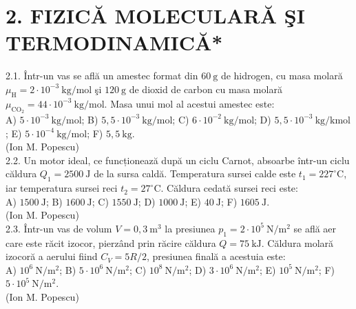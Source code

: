 
\section*{2. FIZICĂ MOLECULARĂ ŞI TERMODINAMICĂ*}


2.1. Într-un vas se află un amestec format din $60 \mathrm{~g}$ de hidrogen, cu masa molară $\mu_{\mathrm{H}}=2 \cdot 10^{-3} \mathrm{~kg} / \mathrm{mol}$ şi $120 \mathrm{~g}$ de dioxid de carbon cu masa molară $\mu_{\mathrm{CO_{2}}}=44 \cdot 10^{-3} \mathrm{~kg} / \mathrm{mol}$. Masa unui mol al acestui amestec este:\\ A) $5 \cdot 10^{-3} \mathrm{~kg} / \mathrm{mol}$; B) $5,5 \cdot 10^{-3} \mathrm{~kg} / \mathrm{mol}$; C) $6 \cdot 10^{-2} \mathrm{~kg} / \mathrm{mol}$; D) $5,5 \cdot 10^{-3} \mathrm{~kg} / \mathrm{kmol}$; E) $5 \cdot 10^{-4} \mathrm{~kg} / \mathrm{mol}$; F) $5,5 \mathrm{~kg}$.\\ (Ion M. Popescu)\\

2.2. Un motor ideal, ce funcționează după un ciclu Carnot, absoarbe într-un ciclu căldura $Q_{1}=2500 \mathrm{~J}$ de la sursa caldă. Temperatura sursei calde este $t_{1}=227^{\circ} \mathrm{C}$, iar temperatura sursei reci $t_{2}=27^{\circ} \mathrm{C}$. Căldura cedată sursei reci este:\\ A) $1500 \mathrm{~J}$; B) $1600 \mathrm{~J}$; C) $1550 \mathrm{~J}$; D) $1000 \mathrm{~J}$; E) $40 \mathrm{~J}$; F) $1605 \mathrm{~J}$.\\ (Ion M. Popescu)\\

2.3. Într-un vas de volum $V=0,3 \mathrm{~m}^{3}$ la presiunea $p_{1}=2 \cdot 10^{5} \mathrm{~N} / \mathrm{m}^{2}$ se află aer care este răcit izocor, pierzând prin răcire căldura $Q=75 \mathrm{~kJ}$. Căldura molară izocoră a aerului fiind $C_{V}=5 R / 2$, presiunea finală a acestuia este:\\ A) $10^{6} \mathrm{~N} / \mathrm{m}^{2}$; B) $5 \cdot 10^{6} \mathrm{~N} / \mathrm{m}^{2}$; C) $10^{8} \mathrm{~N} / \mathrm{m}^{2}$; D) $3 \cdot 10^{6} \mathrm{~N} / \mathrm{m}^{2}$; E) $10^{5} \mathrm{~N} / \mathrm{m}^{2}$; F) $5 \cdot 10^{5} \mathrm{~N} / \mathrm{m}^{2}$.\\ (Ion M. Popescu)\\

